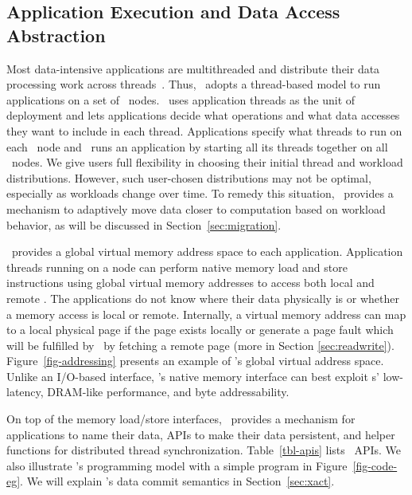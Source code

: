 \subsection{Application Execution and Data Access Abstraction}
Most data-intensive applications are multithreaded 
and distribute their data processing work across threads~\cite{MongoDB,Gonzalez12-OSDI}.
Thus, \hotpot\ adopts a thread-based model to run applications on a set of \hotpot\ nodes.
\hotpot\ uses application threads as the unit of deployment and
lets applications decide what operations and what data accesses they want to include in each thread.
Applications specify what threads to run on each \hotpot\ node 
and \hotpot\ runs an application by starting all its threads together on all \hotpot\ nodes. 
We give users full flexibility in choosing their initial thread and workload distributions.
However, such user-chosen distributions may not be optimal, especially as workloads change over time.
To remedy this situation, 
\hotpot\ provides a mechanism to adaptively move data closer to computation based on workload behavior, 
as will be discussed in Section~\ref{sec:migration}.


\hotpot\ provides a global virtual memory address space to each application.
Application threads running on a node can perform native memory load and store instructions using global virtual memory addresses 
to access both local and remote \nvm.
The applications do not know where their data physically is or whether a memory access is local or remote.
Internally, a virtual memory address can map to a local physical page if the page exists locally or 
generate a page fault which will be fulfilled by \hotpot\ by fetching a remote page (more in Section \ref{sec:readwrite}). 
Figure~\ref{fig-addressing} presents an example of \hotpot's global virtual address space.
Unlike an I/O-based interface, \hotpot's native memory interface can best exploit \nvm{}s' low-latency, DRAM-like performance, and byte addressability.

On top of the memory load/store interfaces, \hotpot\ provides a mechanism for applications to 
name their data,
APIs to make their data persistent, %
and helper functions for distributed thread synchronization. 
Table~\ref{tbl-apis} lists \hotpot\ APIs.
We also illustrate \hotpot's programming model with a simple program in Figure~\ref{fig-code-eg}.
We will explain \hotpot's data commit semantics in Section~\ref{sec:xact}.

